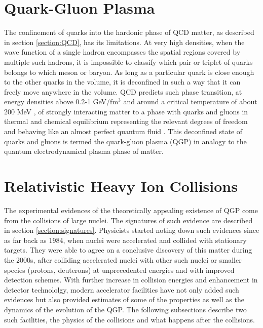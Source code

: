 \section{Quark-Gluon Plasma}
The confinement of quarks into the hardonic phase of QCD matter, as described in section \ref{section:QCD}, has its limitations. At very high densities, when the wave function of a single hadron encompasses the spatial regions covered by multiple such hadrons, it is impossible to classify which pair or triplet of quarks belongs to which meson or baryon. As long as a particular quark is close enough to the other quarks in the volume, it is deconfined in such a way that it can freely move anywhere in the volume. \cite{0954-3899-32-3-R01} QCD predicts such phase transition, at energy densities above 0.2-1 GeV/fm$^{3}$ \cite{Adam:2139456} and around a critical temperature of about 200 MeV \cite{2013arXiv1304.1452M}, of strongly interacting matter to a phase with quarks and gluons in thermal and chemical equilibrium representing the relevant degrees of freedom and behaving like an almost perfect quantum fluid \cite{PhysRevLett.109.152303}. This deconfined state of quarks and gluons is termed the quark-gluon plasma (QGP) in analogy to the quantum electrodynamical plasma phase of matter.


\section{Relativistic Heavy Ion Collisions}\label{section:RHI-collisions}
The experimental evidences of the theoretically appealing existence of QGP come from the collisions of large nuclei. The signatures of such evidence are described in section \ref{section:signatures}. Physicists started noting down such evidences since as far back as 1984, when nuclei were accelerated and collided with stationary targets.\cite{Gyulassy:2004vg} They were able to agree on a conclusive discovery of this matter during the 2000s, after colliding accelerated nuclei with other such nuclei or smaller species (protons, deuterons) at unprecedented energies and with improved detection schemes. \cite{Ritter:2004xj} With further increase in collision energies and enhancement in detector technololgy, modern accelerator facilities have not only added such evidences but also provided estimates of some of the properties as well as the dynamics of the evolution of the QGP. The following subsections describe two such facilities, the physics of the collisions and what happens after the collisions.

